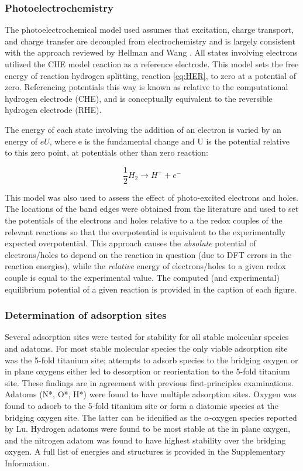 \documentclass[journal=ascecg,manuscript=article,articletitle=true]{achemso}
\begin{document}
\subsubsection{Photoelectrochemistry}
The photoelectrochemical model used assumes that excitation, charge transport, and charge transfer are decoupled from electrochemistry and is largely consistent with the approach reviewed by Hellman and Wang \cite{Hellman2017}. All states involving electrons utilized the CHE model reaction as a reference electrode. This model sets the free energy of reaction hydrogen splitting, reaction \ref{eq:HER}, to zero at a potential of zero. Referencing potentials this way is known as relative to the computational hydrogen electrode (CHE), and is conceptually equivalent to the reversible hydrogen electrode (RHE)\cite{Peterson_2010}.

The energy of each state involving the addition of an electron is varied by an energy of $eU$, where e is the fundamental change and U is the potential relative to this zero point, at potentials other than zero reaction:

\begin{equation}
	\label{eq:HER}
	\frac{1}{2}H_2\rightarrow H^{+}+e^{-}
\end{equation}

This model was also used to assess the effect of photo-excited electrons and holes. The locations of the band edges were obtained from the literature \cite{Nozik_1996} and used to set the potentials of the electrons and holes relative to a the redox couples of the relevant reactions so that the overpotential is equivalent to the experimentally expected overpotential. This approach causes the \textit{absolute} potential of electrons/holes to depend on the reaction in question (due to DFT errors in the reaction energies), while the \textit{relative} energy of electrons/holes to a given redox couple is equal to the experimental value. The computed (and experimental) equilibrium potential of a given reaction is provided in the caption of each figure.

\subsubsection{Determination of adsorption sites}

Several adsorption sites were tested for stability for all stable molecular species and adatoms. For most stable molecular species the only viable adsorption site was the 5-fold titanium site; attempts to adsorb species to the bridging oxygen or in plane oxygens either led to desorption or reorientation to the 5-fold titanium site. These findings are in agreement with previous first-principles examinations.\cite{Sorescu2000,Stodt2013} Adatoms (N*, O*, H*) were found to have multiple adsorption sites. Oxygen was found to adsorb to the 5-fold titanium site or form a diatomic species at the bridging oxygen site. The latter can be idenified as the $\alpha$-oxygen species reported by Lu.\cite{Lu1994} Hydrogen adatoms were found to be most stable at the in plane oxygen, and the nitrogen adatom was found to have highest stability over the bridging oxygen. A full list of energies and structures is provided in the Supplementary Information.
\end{document}
